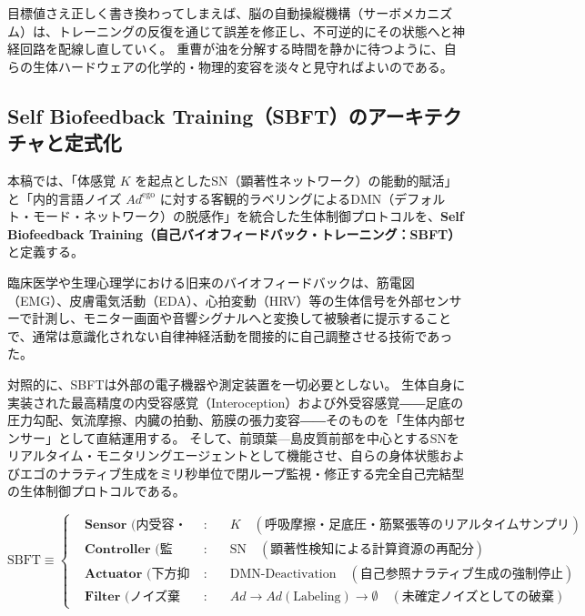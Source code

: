 目標値さえ正しく書き換わってしまえば、脳の自動操縦機構（サーボメカニズム）は、トレーニングの反復を通じて誤差を修正し、不可逆的にその状態へと神経回路を配線し直していく。
重曹が油を分解する時間を静かに待つように、自らの生体ハードウェアの化学的・物理的変容を淡々と見守ればよいのである。

\subsection{Self Biofeedback Training（SBFT）のアーキテクチャと定式化}

本稿では、「体感覚 $K$ を起点としたSN（顕著性ネットワーク）の能動的賦活」と「内的言語ノイズ $Ad^{\mathrm{ego}}$ に対する客観的ラベリングによるDMN（デフォルト・モード・ネットワーク）の脱感作」を統合した生体制御プロトコルを、\textbf{Self Biofeedback Training（自己バイオフィードバック・トレーニング：SBFT）}と定義する。

臨床医学や生理心理学における旧来のバイオフィードバックは、筋電図（EMG）、皮膚電気活動（EDA）、心拍変動（HRV）等の生体信号を外部センサーで計測し、モニター画面や音響シグナルへと変換して被験者に提示することで、通常は意識化されない自律神経活動を間接的に自己調整させる技術であった。

対照的に、SBFTは外部の電子機器や測定装置を一切必要としない。
生体自身に実装された最高精度の内受容感覚（Interoception）および外受容感覚――足底の圧力勾配、気流摩擦、内臓の拍動、筋膜の張力変容――そのものを「生体内部センサー」として直結運用する。
そして、前頭葉—島皮質前部を中心とするSNをリアルタイム・モニタリングエージェントとして機能させ、自らの身体状態およびエゴのナラティブ生成をミリ秒単位で閉ループ監視・修正する完全自己完結型の生体制御プロトコルである。

\begin{equation}
    \text{SBFT} \equiv \left\{
    \begin{aligned}
        &\textbf{Sensor (内受容・外受容)} & : & \quad K \quad (\text{呼吸摩擦・足底圧・筋緊張等のリアルタイムサンプリング}) \\
        &\textbf{Controller (監視・切替)} & : & \quad \mathrm{SN} \quad (\text{顕著性検知による計算資源の再配分}) \\
        &\textbf{Actuator (下方抑制)} & : & \quad \mathrm{DMN\text{-}Deactivation} \quad (\text{自己参照ナラティブ生成の強制停止}) \\
        &\textbf{Filter (ノイズ棄却)} & : & \quad Ad \xrightarrow{} Ad (\text{Labeling}) \longrightarrow \emptyset \quad (\text{未確定ノイズとしての破棄})
    \end{aligned}
    \right.
\end{equation}


